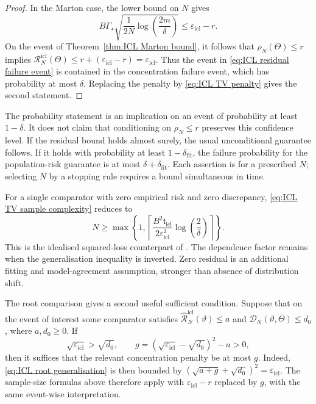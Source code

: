 \begin{proof}
In the Marton case, the lower bound on \(N\) gives
\[
B\Gamma_\star\sqrt{\frac{1}{2N}\log\left(\frac{2m}{\delta}\right)}
\leqslant\varepsilon_{\mathrm{icl}}-r.
\]
On the event of Theorem~\ref{thm:ICL Marton bound}, it follows that
\(\rho_N(\Theta)\leqslant r\) implies
\(\mathcal R_N^{\mathrm{icl}}(\Theta)\leqslant r+(\varepsilon_{\mathrm{icl}}-r)=\varepsilon_{\mathrm{icl}}\).
Thus the event in \eqref{eq:ICL residual failure event} is contained in the concentration failure event, which has probability at most \(\delta\). Replacing the penalty by \eqref{eq:ICL TV penalty} gives the second statement.
\end{proof}

The probability statement is an implication on an event of probability at least \(1-\delta\). It does not claim that conditioning on \(\rho_N\leqslant r\) preserves this confidence level. If the residual bound holds almost surely, the usual unconditional guarantee follows. If it holds with probability at least \(1-\delta_{\mathrm{fit}}\), the failure probability for the population-risk guarantee is at most \(\delta+\delta_{\mathrm{fit}}\). Each assertion is for a prescribed \(N\); selecting \(N\) by a stopping rule requires a bound simultaneous in time.

For a single comparator with zero empirical risk and zero discrepancy, \eqref{eq:ICL TV sample complexity} reduces to
\[
N\geqslant\max\left\{1,
\left\lceil\frac{B^2\mathfrak t_{\mathrm{icl}}}{2\varepsilon_{\mathrm{icl}}^2}
\log\left(\frac2\delta\right)\right\rceil\right\}.
\]
This is the idealised squared-loss counterpart of \cite[Proposition~6.2]{ZekriEtAl2025}. The dependence factor remains when the generalisation inequality is inverted. Zero residual is an additional fitting and model-agreement assumption, stronger than absence of distribution shift.

The root comparison gives a second useful sufficient condition. Suppose that on the event of interest some comparator satisfies \(\widehat{\mathcal R}_N^{\mathrm{icl}}(\vartheta)\leqslant a\) and \(\mathcal D_N(\vartheta,\Theta)\leqslant d_0\), where \(a,d_0\geqslant0\). If
\[
\sqrt{\varepsilon_{\mathrm{icl}}}>\sqrt{d_0},
\qquad g=(\sqrt{\varepsilon_{\mathrm{icl}}}-\sqrt{d_0})^2-a>0,
\]
then it suffices that the relevant concentration penalty be at most \(g\). Indeed, \eqref{eq:ICL root generalisation} is then bounded by \((\sqrt{a+g}+\sqrt{d_0})^2=\varepsilon_{\mathrm{icl}}\). The sample-size formulas above therefore apply with \(\varepsilon_{\mathrm{icl}}-r\) replaced by \(g\), with the same event-wise interpretation.

